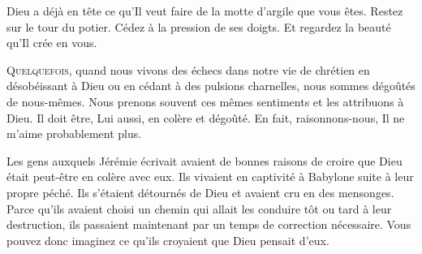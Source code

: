Dieu a déjà en tête ce qu'Il veut faire de la motte d'argile que vous êtes.
 Restez sur le tour du potier. Cédez à la pression de ses doigts.
 Et regardez la beauté qu'Il crée en vous. 

\dvrule








\lettrine{Q}{uelquefois,} quand nous vivons des échecs
 dans notre vie de chrétien en désobéissant à Dieu ou en cédant
 à des pulsions charnelles, nous sommes dégoûtés de nous-mêmes.
 Nous prenons souvent ces mêmes sentiments et les attribuons à Dieu.
 \Og Il doit être, Lui aussi, en colère et dégoûté.
 En fait, 
 raisonnons-nous, 
 Il ne m'aime probablement plus. \Fg{}


Les gens auxquels Jérémie écrivait avaient de bonnes raisons de croire
 que Dieu était peut-être en colère avec eux. Ils vivaient en captivité
 à Babylone suite à leur propre péché. Ils s'étaient détournés de Dieu
 et avaient cru en des mensonges. Parce qu'ils avaient choisi un chemin
 qui allait les conduire tôt ou tard à leur destruction,
 ils passaient maintenant par un temps de correction nécessaire.
 Vous pouvez donc imaginez ce qu'ils croyaient que Dieu pensait d'eux. 

